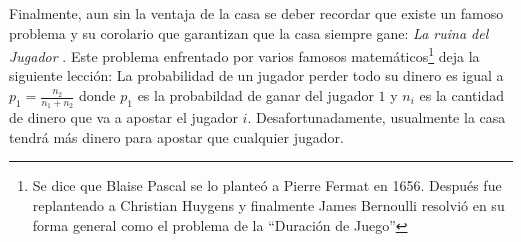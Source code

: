 \begin{table}[ht]
\centering
{}
\caption{Ventajas de la casa para juegos populares de casino \cite{hannum2005practical}}
\label{ventaja-casa}
\end{table}

Finalmente, aun sin la ventaja de la casa se deber recordar que existe un famoso problema y su corolario que garantizan que la casa siempre gane: \emph{La ruina del Jugador} \cite[p.~95-99]{ross2006first}. Este problema enfrentado por varios famosos matemáticos\footnote{Se dice que Blaise Pascal se lo planteó a Pierre Fermat en 1656. Después fue replanteado a Christian Huygens y finalmente James Bernoulli resolvió en su forma general como el problema de la ``Duración de Juego''} deja la siguiente lección: La probabilidad de un jugador perder todo su dinero es igual a  $p_1 = \frac{n_2}{n_1 + n_2}$ donde $p_1$ es la probabildad de ganar del jugador $1$ y $n_i$ es la cantidad de dinero que va a apostar el jugador $i$. Desafortunadamente, usualmente  la casa tendrá más dinero para apostar que cualquier jugador.


